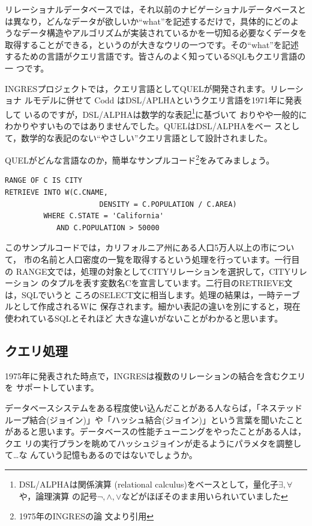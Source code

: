 リレーショナルデータベースでは，それ以前のナビゲーショナルデータベースと
は異なり，どんなデータが欲しいか``what''を記述するだけで，具体的にどのよ
うなデータ構造やアルゴリズムが実装されているかを一切知る必要なくデータを
取得することができる，というのが大きなウリの一つです。その``what''を記述
するための言語がクエリ言語です。皆さんのよく知っているSQLもクエリ言語の一
つです。


INGRESプロジェクトでは，クエリ言語としてQUELが開発されます。リレーショナ
ルモデルに併せて Codd はDSL/APLHAというクエリ言語を1971年に発表して
いるのですが，DSL/ALPHAは数学的な表記\footnote{DSL/ALPHAは関係演算
(relational calculus)をベースとして，量化子$\exists, \forall$や，論理演算
の記号$\lnot,\land,\lor$などがほぼそのまま用いられいていました}に基づいて
おりやや一般的にわかりやすいものではありませんでした。QUELはDSL/ALPHAをベー
スとして，数学的な表記のない``やさしい''クエリ言語として設計されました。


QUELがどんな言語なのか，簡単なサンプルコード\footnote{1975年のINGRESの論
文より引用}をみてみましょう。

\begin{center}
 \begin{minipage}{0.8\textwidth}
  \begin{lstlisting}
RANGE OF C IS CITY
RETRIEVE INTO W(C.CNAME,
                      DENSITY = C.POPULATION / C.AREA)
         WHERE C.STATE = 'California'
            AND C.POPULATION > 50000
  \end{lstlisting}
 \end{minipage}
\end{center}

このサンプルコードでは，カリフォルニア州にある人口5万人以上の市について，
市の名前と人口密度の一覧を取得するという処理を行っています。一行目の
RANGE文では，処理の対象としてCITYリレーションを選択して，CITYリレーション
のタプルを表す変数名Cを宣言しています。二行目のRETRIEVE文は，SQLでいうと
ころのSELECT文に相当します。処理の結果は，一時テーブルとして作成されるWに
保存されます。細かい表記の違いを別にすると，現在使われているSQLとそれほど
大きな違いがないことがわかると思います。


\subsection{クエリ処理}


1975年に発表された時点で，INGRESは複数のリレーションの結合を含むクエリを
サポートしています。


データベースシステムをある程度使い込んだことがある人ならば，「ネステッド
ループ結合(ジョイン)」や「ハッシュ結合(ジョイン)」という言葉を聞いたこと
があると思います。データベースの性能チューニングをやったことがある人は，クエ
リの実行プランを眺めてハッシュジョインが走るようにパラメタを調整して…な
んていう記憶もあるのではないでしょうか。


